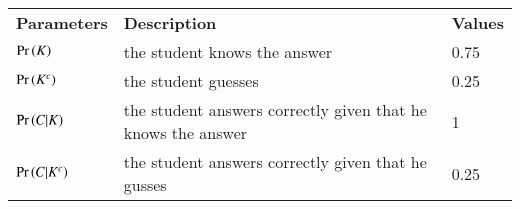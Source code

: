 \begin{tabular}{|l|l|l|} 
\hline
\textbf{Parameters}&\textbf{Description}&\textbf{Values} \\
$\Pr\left(K\right)$& the student knows the answer &0.75\\ \hline
$\Pr\left(K^c\right)$& the student guesses &0.25\\ \hline
$\Pr\left(C|K\right)$& the student answers correctly given that he knows the answer &1\\ \hline
$\Pr\left(C|K^c\right)$& the student answers correctly given that he gusses &0.25\\ \hline
\end{tabular}\\\\
